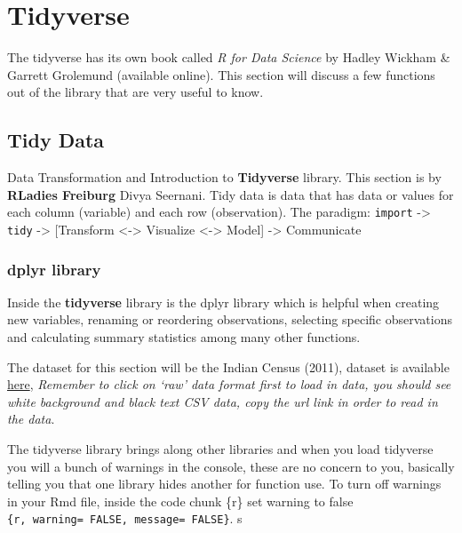 \documentclass[
]{book}
\theoremstyle{definition}
\theoremstyle{definition}
\theoremstyle{definition}
\theoremstyle{definition}
\theoremstyle{remark}
\begin{document}
\hypertarget{tidyverse}{%
\chapter{Tidyverse}\label{tidyverse}}

The tidyverse has its own book called \emph{R for Data Science} by Hadley Wickham \& Garrett Grolemund (available online). This section will discuss a few functions out of the library that are very useful to know.

\hypertarget{tidy-data}{%
\section{Tidy Data}\label{tidy-data}}

Data Transformation and Introduction to \textbf{Tidyverse} library. This section is by \textbf{RLadies Freiburg} Divya Seernani.
Tidy data is data that has data or values for each column (variable) and each row (observation). The paradigm:
\texttt{import} -\textgreater{} \texttt{tidy} -\textgreater{} {[}Transform \textless-\textgreater{} Visualize \textless-\textgreater{} Model{]} -\textgreater{} Communicate

\hypertarget{dplyr-library}{%
\subsection{dplyr library}\label{dplyr-library}}

Inside the \textbf{tidyverse} library is the dplyr library which is helpful when creating new variables, renaming or reordering observations, selecting specific observations and calculating summary statistics among many other functions.

The dataset for this section will be the Indian Census (2011), dataset is available \href{https://github.com/nishusharma1608/India-Census-2011-Analysis/blob/master/india-districts-census-2011.csv}{here}, \emph{Remember to click on `raw' data format first to load in data, you should see white background and black text CSV data, copy the url link in order to read in the data}.

The tidyverse library brings along other libraries and when you load tidyverse you will a bunch of warnings in the console, these are no concern to you, basically telling you that one library hides another for function use. To turn off warnings in your Rmd file, inside the code chunk \{r\} set warning to false \texttt{\{r,\ warning=\ FALSE,\ message=\ FALSE\}}.
s
\end{document}
